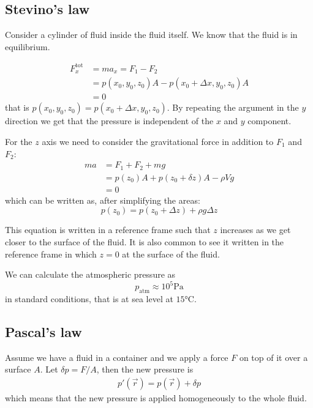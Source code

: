 \documentclass[12pt]{extarticle}
\begin{document}
\subsection{Stevino's law}

Consider a cylinder of fluid inside the fluid itself. We know that the fluid is in equilibrium.

\begin{align}
    F_x^{\text{tot}} & = m a_x = F_1 - F_2                                    \\
                     & = p (x_0, y_0, z_0) A - p (x_0 + \Delta x, y_0, z_0) A \\
                     & = 0
\end{align}
that is $p (x_0, y_0, z_0) = p (x_0 + \Delta x, y_0, z_0)$.
By repeating the argument in the $y$ direction we get that the pressure is independent of the $x$ and $y$ component.

For the $z$ axis we need to consider the gravitational force in addition to $F_1$ and $F_2$:
\begin{align}
    m a & = F_1 + F_2 + m g                           \\
        & = p(z_0) A + p(z_0 + \delta z) A - \rho V g \\
        & = 0
\end{align}
which can be written as, after simplifying the areas:
\begin{equation}
    p(z_0) = p(z_0 + \Delta z) + \rho g \Delta z
\end{equation}

This equation is written in a reference frame such that $z$ increases as we get closer to the surface of the fluid.
It is also common to see it written in the reference frame in which $z = 0$ at the surface of the fluid.

We can calculate the atmospheric pressure as
\begin{equation}
    p_\text{atm} \approx 10^5 \si{\pascal}
\end{equation}
in standard conditions, that is at sea level at $15 \si{\celsius}$.

\subsection{Pascal's law}

Assume we have a fluid in a container and we apply a force $F$ on top of it over a surface $A$.
Let $\delta p = F/A$, then the new pressure is
\begin{eqnarray}
    p'(\vec r) = p (\vec r) + \delta p
\end{eqnarray}
which means that the new pressure is applied homogeneously to the whole fluid.
\end{document}
